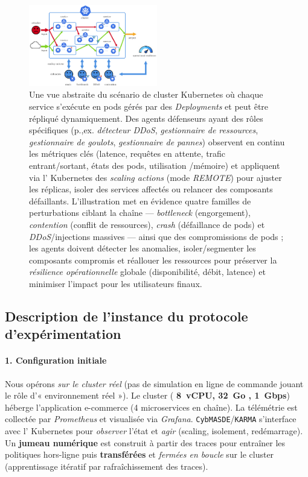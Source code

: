 \begin{figure}[h!]
  \centering
  \hspace{-0.4cm}
  \includegraphics[trim=0cm 0cm 0cm 0cm, clip, width=0.5\textwidth]{figures/scenario_introduction.pdf}
  \caption{Une vue abstraite du scénario de cluster Kubernetes où chaque service s’exécute en pods gérés par des \textit{Deployments} et peut être répliqué dynamiquement. Des agents défenseurs ayant des rôles spécifiques (p.,ex. \textit{détecteur DDoS}, \textit{gestionnaire de ressources}, \textit{gestionnaire de goulots}, \textit{gestionnaire de pannes}) observent en continu les métriques clés (latence, requêtes en attente, trafic entrant/sortant, états des pods, utilisation /mémoire) et appliquent via l’ Kubernetes des \textit{scaling actions} (mode \textit{REMOTE}) pour ajuster les réplicas, isoler des services affectés ou relancer des composants défaillants. L’illustration met en évidence quatre familles de perturbations ciblant la chaîne — \textit{bottleneck} (engorgement), \textit{contention} (conflit de ressources), \textit{crash} (défaillance de pods) et \textit{DDoS}/injections massives — ainsi que des compromissions de pods ; les agents doivent détecter les anomalies, isoler/segmenter les composants compromis et réallouer les ressources pour préserver la \textit{résilience opérationnelle} globale (disponibilité, débit, latence) et minimiser l’impact pour les utilisateurs finaux.}
  \label{fig:k8s_cluster_graph_intro}
\end{figure}


\subsection{Description de l'instance du protocole d'expérimentation}

\paragraph{1. Configuration initiale}

Nous opérons \emph{sur le cluster réel} (pas de simulation en ligne de commande jouant le rôle d’« environnement réel »). Le cluster (\textbf{ 8~vCPU, 32~Go , 1~Gbps}) héberge l’application e-commerce (4 microservices en chaîne). La télémétrie est collectée par \textit{Prometheus} et visualisée via \textit{Grafana}. \texttt{CybMASDE}/\texttt{KARMA} s’interface avec l’ Kubernetes pour \textit{observer} l’état et \textit{agir} (scaling, isolement, redémarrage). Un \textbf{jumeau numérique} est construit à partir des traces pour entraîner les politiques hors-ligne puis \textbf{transférées} et \textit{fermées en boucle} sur le cluster (apprentissage itératif par rafraîchissement des traces).

